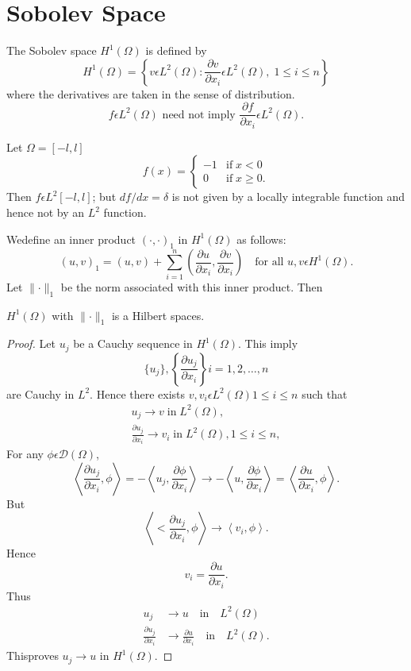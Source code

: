 \section{Sobolev Space}\label{chap1:subsec1.3} 
The Sobolev space $H^1(\Omega)$ is defined by 
$$ 
H^1(\Omega)=\left\{v\epsilon L^2(\Omega):\frac{\partial v}{\partial
  x_i} \epsilon L^2(\Omega), \;1\leq i\leq n\right\}
$$
where the derivatives are taken in the sense of distribution.
$$
f\epsilon L^2(\Omega) \text{ need not imply }  
\frac{\partial f}{\partial x_i}\epsilon L^2(\Omega).
$$

\begin{exam}\label{chap1:exam2}
Let $\Omega =[-l, l]$
\begin{equation*}
f(x)=
\begin{cases}
 -1 & \text{if}\; x< 0\\
0 & \text{if}\; x\geq 0.
\end{cases}
\end{equation*}
Then $f\epsilon L^2[-l, l]$; but $df/dx =\delta$ is not given by a
locally integrable function and hence not by an $L^2$ function.  
\end{exam}

We\pageoriginale define an inner product $(\cdotp,\cdotp)_1$ in
$H^1(\Omega)$ as follows:
$$
(u, v)_1=(u, v)+\sum\limits_{i=1}^{n}\left(\frac{\partial u}{\partial x_i},
\frac{\partial v}{\partial x_i}\right)\quad \text{for all } u, v \epsilon
H^1(\Omega). 
$$
Let $\parallel \cdotp \parallel_1$ be the norm associated with this
inner product. Then 

\begin{lem}\label{chap1:lem1}
$H^1(\Omega)$ with $\parallel \cdotp\parallel_1$ is a Hilbert spaces.
\end{lem}

\begin{proof}
Let $u_j$ be a Cauchy sequence in $H^1(\Omega)$. This imply 
$$
\{u_j\},\left\{\frac{\partial u_j}{\partial x_i}\right\} 
i=1, 2, \ldots, n 
$$
are Cauchy in $L^2$. Hence there exists $v, v_i\epsilon L^2(\Omega)
1\leq i\leq n$ such that 
\begin{gather*}
u_j\to v \; \text{in} \; L^2(\Omega),\\
\frac{\partial u_j}{\partial x_i}\to v_i \; 
\text{in} \; L^2(\Omega), 1\leq i\leq n,
\end{gather*}
For any $\phi\epsilon\mathscr{D}(\Omega)$,
$$
\left\langle\frac{\partial u_j}{\partial x_i},\phi \right\rangle = -\left\langle u_j,
\frac{\partial\phi}{\partial x_i}\right\rangle\to - \left\langle u, \frac{\partial\phi}
{\partial x_i}\right\rangle=\left\langle\frac{\partial u}{\partial x_i},\phi\right\rangle.
$$
But 
$$
\left\langle<\frac{\partial u_j}{\partial x_i}, \phi\right\rangle\to 
\left\langle v_i, \phi \right\rangle.
$$
Hence
$$
v_i=\frac{\partial u}{\partial x_i}.
$$
Thus
\begin{align*}
u_j &\to u \quad\text{in} \quad L^2(\Omega)\\
\frac{{\partial u}_j}{\partial x_i}&\to \frac{\partial u}{\partial x_i}
\quad\text{in} \quad L^2(\Omega).
\end{align*}
This\pageoriginale proves $u_j\to u$ in $H^1(\Omega)$. 
\end{proof}

